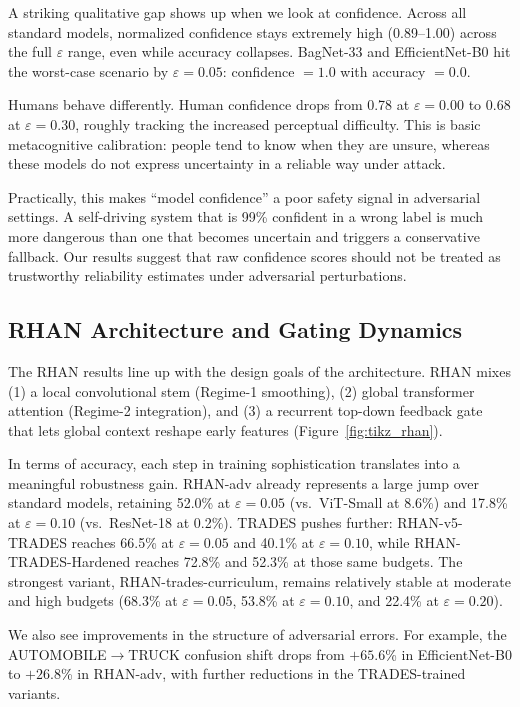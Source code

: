 \documentclass[12pt,a4paper]{article}
\begin{document}
A striking qualitative gap shows up when we look at confidence. Across all
standard models, normalized confidence stays extremely high (0.89--1.00) across
the full $\varepsilon$ range, even while accuracy collapses. BagNet-33 and
EfficientNet-B0 hit the worst-case scenario by $\varepsilon{=}0.05$: confidence
$= 1.0$ with accuracy $= 0.0$.

Humans behave differently. Human confidence drops from 0.78 at
$\varepsilon{=}0.00$ to 0.68 at $\varepsilon{=}0.30$, roughly tracking the
increased perceptual difficulty. This is basic metacognitive calibration:
people tend to know when they are unsure, whereas these models do not express
uncertainty in a reliable way under attack.

Practically, this makes ``model confidence'' a poor safety signal in adversarial
settings. A self-driving system that is 99\% confident in a wrong label is much
more dangerous than one that becomes uncertain and triggers a conservative
fallback. Our results suggest that raw confidence scores should not be treated
as trustworthy reliability estimates under adversarial perturbations.

\subsection{RHAN Architecture and Gating Dynamics}

The RHAN results line up with the design goals of the architecture. RHAN mixes
(1) a local convolutional stem (Regime-1 smoothing), (2) global transformer
attention (Regime-2 integration), and (3) a recurrent top-down feedback gate that
lets global context reshape early features (Figure~\ref{fig:tikz_rhan}).

In terms of accuracy, each step in training sophistication translates into a
meaningful robustness gain. RHAN-adv already represents a large jump over
standard models, retaining 52.0\% at $\varepsilon{=}0.05$ (vs.\ ViT-Small at 8.6\%)
and 17.8\% at $\varepsilon{=}0.10$ (vs.\ ResNet-18 at 0.2\%). TRADES pushes further:
RHAN-v5-TRADES reaches 66.5\% at $\varepsilon{=}0.05$ and 40.1\% at
$\varepsilon{=}0.10$, while RHAN-TRADES-Hardened reaches 72.8\% and 52.3\% at those
same budgets. The strongest variant, RHAN-trades-curriculum, remains relatively
stable at moderate and high budgets (68.3\% at $\varepsilon{=}0.05$, 53.8\% at
$\varepsilon{=}0.10$, and 22.4\% at $\varepsilon{=}0.20$).

We also see improvements in the structure of adversarial errors. For example,
the AUTOMOBILE$\to$TRUCK confusion shift drops from $+65.6$\% in EfficientNet-B0
to $+26.8$\% in RHAN-adv, with further reductions in the TRADES-trained variants.
\end{document}
